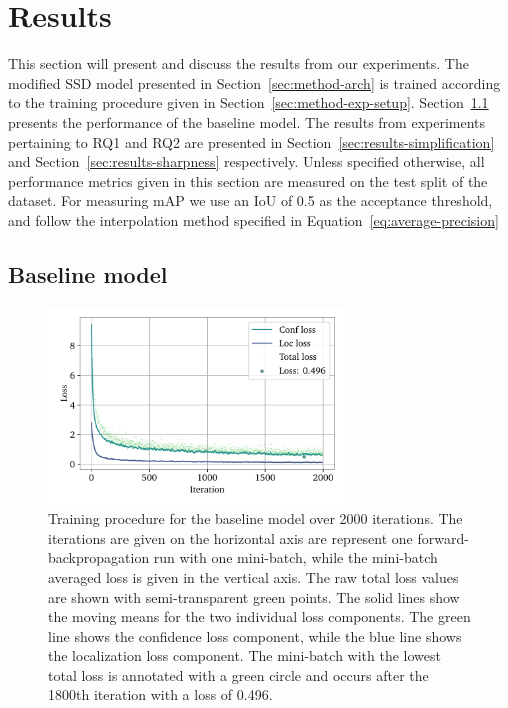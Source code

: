 \chapter{Results}\label{cha:results}

This section will present and discuss the results from our experiments.
The modified SSD model presented in Section~\ref{sec:method-arch} is trained according to the training procedure given in Section~\ref{sec:method-exp-setup}.
Section~\ref{sec:results-baseline} presents the performance of the baseline model. 
The results from experiments pertaining to RQ1 and RQ2 are presented in Section~\ref{sec:results-simplification} and Section~\ref{sec:results-sharpness} respectively.
Unless specified otherwise, all performance metrics given in this section are measured on the test split of the dataset.
For measuring mAP we use an IoU of 0.5 as the acceptance threshold, and follow the interpolation method specified in Equation~\ref{eq:average-precision}

\section{Baseline model}\label{sec:results-baseline}
\begin{figure}[htbp]
    \centering
    \includegraphics[width=0.7\textwidth]{figs/results/baseline/loss2.pdf}
    \caption[Baseline training procedure]{%
Training procedure for the baseline model over 2000 iterations.
The iterations are given on the horizontal axis are represent one forward-backpropagation run with one mini-batch, while the mini-batch averaged loss is given in the vertical axis.
The raw total loss values are shown with semi-transparent green points.
The solid lines show the moving means for the two individual loss components.
The green line shows the confidence loss component, while the blue line shows the localization loss component.
The mini-batch with the lowest total loss is annotated with a green circle and occurs after the 1800th iteration with a loss of 0.496.
    }\label{fig:method-baseline-loss}
  \end{figure}

